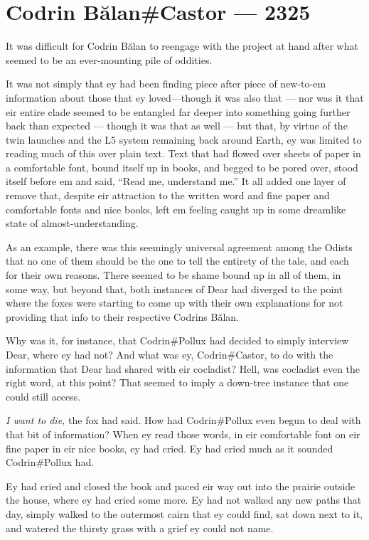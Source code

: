 \hypertarget{codrin-bux103lancastor-2325}{%
\chapter{Codrin Bălan\#Castor — 2325}\label{codrin-bux103lancastor-2325}}

It was difficult for Codrin Bălan to reengage with the project at hand after what seemed to be an ever-mounting pile of oddities.

It was not simply that ey had been finding piece after piece of new-to-em information about those that ey loved---though it was also that — nor was it that eir entire clade seemed to be entangled far deeper into something going further back than expected — though it was that as well — but that, by virtue of the twin launches and the L5 system remaining back around Earth, ey was limited to reading much of this over plain text. Text that had flowed over sheets of paper in a comfortable font, bound itself up in books, and begged to be pored over, stood itself before em and said, ``Read me, understand me.'' It all added one layer of remove that, despite eir attraction to the written word and fine paper and comfortable fonts and nice books, left em feeling caught up in some dreamlike state of almost-understanding.

As an example, there was this seemingly universal agreement among the Odists that no one of them should be the one to tell the entirety of the tale, and each for their own reasons. There seemed to be shame bound up in all of them, in some way, but beyond that, both instances of Dear had diverged to the point where the foxes were starting to come up with their own explanations for not providing that info to their respective Codrins Bălan.

Why was it, for instance, that Codrin\#Pollux had decided to simply interview Dear, where ey had not? And what was ey, Codrin\#Castor, to do with the information that Dear had shared with eir cocladist? Hell, was cocladist even the right word, at this point? That seemed to imply a down-tree instance that one could still access.

\emph{I want to die,} the fox had said. How had Codrin\#Pollux even begun to deal with that bit of information? When ey read those words, in eir comfortable font on eir fine paper in eir nice books, ey had cried. Ey had cried much as it sounded Codrin\#Pollux had.

Ey had cried and closed the book and paced eir way out into the prairie outside the house, where ey had cried some more. Ey had not walked any new paths that day, simply walked to the outermost cairn that ey could find, sat down next to it, and watered the thirsty grass with a grief ey could not name.

